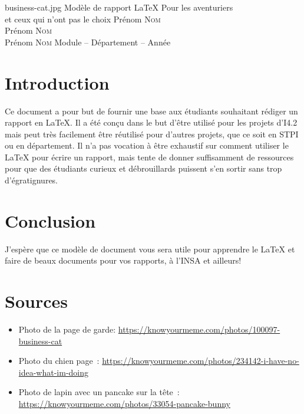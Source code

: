 \documentclass[11pt,a4paper]{article}
\begin{document}
\PageDeGarde	
{business-cat.jpg} %
{Modèle de rapport \LaTeX{}} %
{Pour les aventuriers\\et ceux qui n'ont pas le choix} %
{Prénom \textsc{Nom}\\
Prénom \textsc{Nom}\\
Prénom \textsc{Nom}} %
{Module – Département – Année} %



\tableofcontents

\clearpage %
\section*{Introduction} %

    Ce document a pour but de fournir une base aux étudiants souhaitant rédiger un rapport en \LaTeX.
    Il a été conçu dans le but d'être utilisé pour les projets d'I4.2 mais peut très facilement être réutilisé pour d'autres projets, que ce soit en STPI ou en département.
    Il n'a pas vocation à être exhaustif sur comment utiliser le \LaTeX{} pour écrire un rapport, mais tente de donner suffisamment de ressources pour que des étudiants curieux et débrouillards puissent s'en sortir sans trop d'égratignures.


\clearpage %




\clearpage %

\section{Conclusion}

    J'espère que ce modèle de document vous sera utile pour apprendre le \LaTeX{} et faire de beaux documents pour vos rapports, à l'INSA et ailleurs!


\clearpage %

\section*{Sources} %
    \begin{itemize}
        \item Photo de la page de garde: \url{https://knowyourmeme.com/photos/100097-business-cat}
        \item Photo du chien page~\pageref{chien}: \url{https://knowyourmeme.com/photos/234142-i-have-no-idea-what-im-doing}
        \item Photo de lapin avec un pancake sur la tête~\pageref{lapin}: \url{https://knowyourmeme.com/photos/33054-pancake-bunny}
    \end{itemize}
\end{document}
